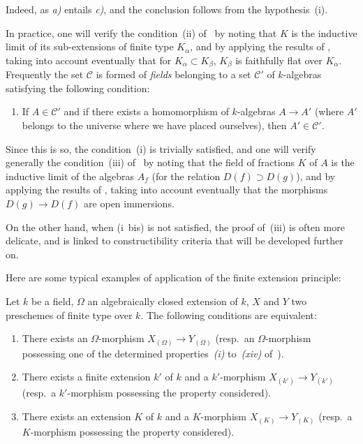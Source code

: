 Indeed, as \emph{a)} entails \emph{c)}, and the conclusion follows from the hypothesis~(i).

\begin{remark}[9.1.3]
\label{IV.9.1.3}
In practice, one will verify the condition~(ii) of~ by noting that $K$ is the inductive limit of its sub-extensions of finite type $K_\alpha$, and by applying the results of , taking into account eventually that for $K_\alpha\subset K_\beta$, $K_\beta$ is faithfully flat over $K_\alpha$.
Frequently the set $\mathcal{C}$ is formed of \emph{fields} belonging to a set $\mathcal{C}'$ of $k$-algebras satisfying the following condition:
\begin{enumerate}[label=(\roman*~bis)]
  \item If $A\in\mathcal{C}'$ and if there exists a homomorphism of $k$-algebras $A\to A'$ (where $A'$ belongs to the universe where we have placed ourselves), then $A'\in\mathcal{C}'$.
\end{enumerate}
\end{remark}

Since this is so, the condition~(i) is trivially satisfied, and one will verify generally the condition~(iii) of~ by noting that the field of fractions $K$ of $A$ is the inductive limit of the algebras $A_f$ (for the relation $D(f)\supset D(g)$), and by applying the results of , taking into account eventually that the morphisms $D(g)\to D(f)$ are open immersions.

On the other hand, when (i~bis) is not satisfied, the proof of~(iii) is often more delicate, and is linked to constructibility criteria that will be developed further on.

Here are some typical examples of application of the finite extension principle:

\begin{proposition}[9.1.4]
\label{IV.9.1.4}
Let $k$ be a field, $\Omega$ an algebraically closed extension of $k$, $X$ and $Y$ two preschemes of finite type over $k$.
The following conditions are equivalent:
\begin{enumerate}[label=\emph{\alph*)}]
  \item There exists an $\Omega$-morphism $X_{(\Omega)}\to Y_{(\Omega)}$ \textnormal{(}resp.\ an $\Omega$-morphism possessing one of the determined properties~\emph{(i)} to~\emph{(xiv)} of~\textnormal{)}.
  \item There exists a finite extension $k'$ of $k$ and a $k'$-morphism $X_{(k')}\to Y_{(k')}$ \textnormal{(}resp.\ a $k'$-morphism possessing the property considered\textnormal{)}.
  \item There exists an extension $K$ of $k$ and a $K$-morphism $X_{(K)}\to Y_{(K)}$ \textnormal{(}resp.\ a $K$-morphism possessing the property considered\textnormal{)}.
\end{enumerate}
\end{proposition}

